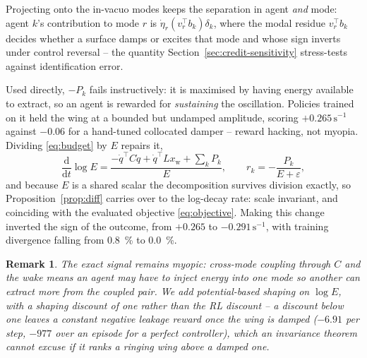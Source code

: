 \documentclass[journal]{new-aiaa}
\newtheorem{remark}{Remark}
\begin{document}
Projecting onto the in-vacuo modes keeps the separation in agent \emph{and}
mode: agent $k$'s contribution to mode $r$ is $\dot\eta_r (v_r^{\top}
b_k)\delta_k$, where the modal residue $v_r^{\top} b_k$ decides whether a
surface damps or excites that mode and whose sign inverts under control
reversal -- the quantity Section~\ref{sec:credit-sensitivity} stress-tests
against identification error.

Used directly, $-P_k$ fails instructively: it is maximised by having energy
available to extract, so an agent is rewarded for \emph{sustaining} the
oscillation. Policies trained on it held the wing at a bounded but undamped
amplitude, scoring $+0.265\,\mathrm{s}^{-1}$ against $-0.06$ for a
hand-tuned collocated damper -- reward hacking, not myopia. Dividing
\eqref{eq:budget} by $E$ repairs it,
\begin{equation}
\frac{\mathrm{d}}{\mathrm{d}t}\log E
= \frac{-\dot q^{\top} C \dot q + \dot q^{\top} L x_{\mathrm{w}} + \sum_k P_k}{E},
\qquad
r_k = -\frac{P_k}{E + \varepsilon},
\label{eq:logcredit}
\end{equation}
\label{sec:log}
and because $E$ is a shared scalar the decomposition survives division
exactly, so Proposition~\ref{prop:diff} carries over to the log-decay rate:
scale invariant, and coinciding with the evaluated objective
\eqref{eq:objective}. Making this change inverted the sign of the outcome,
from $+0.265$ to $-0.291\,\mathrm{s}^{-1}$, with training divergence
falling from \SI{0.8}{\percent} to \SI{0.0}{\percent}.

\begin{remark}
The exact signal remains myopic: cross-mode coupling through $C$ and the
wake means an agent may have to inject energy into one mode so another can
extract more from the coupled pair. We add potential-based shaping
\cite{ng1999shaping} on $\log E$, with a shaping discount of one rather
than the RL discount -- a discount below one leaves a constant negative
leakage reward once the wing is damped ($-6.91$ per step, $-977$ over an
episode for a perfect controller), which an invariance theorem cannot
excuse if it ranks a ringing wing above a damped one.
\end{remark}
\end{document}
